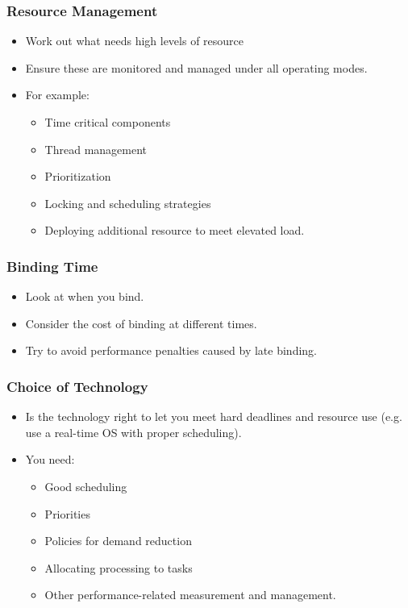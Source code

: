 \documentclass[a4paper]{article}
\begin{document}
\subsubsection{Resource Management}
\begin{itemize}
\item{Work out what needs high levels of resource}
\item{Ensure these are monitored and managed under all operating modes.}
\item{For example:
\begin{itemize}
\item{Time critical components}
\item{Thread management}
\item{Prioritization}
\item{Locking and scheduling strategies}
\item{Deploying additional resource to meet elevated load.}
\end{itemize}
}
\end{itemize}


\subsubsection{Binding Time}
\begin{itemize}
\item{Look at when you bind.}
\item{Consider the cost of binding at different times.}
\item{Try to avoid performance penalties caused by late binding.}
\end{itemize}

\subsubsection{Choice of Technology}
\begin{itemize}
\item{Is the technology right to let you meet hard deadlines and resource use (e.g. use a real-time OS with proper scheduling).}
\item{You need:
\begin{itemize}
\item{Good scheduling}
\item{Priorities}
\item{Policies for demand reduction}
\item{Allocating processing to tasks}
\item{Other performance-related measurement and management.}
\end{itemize}}
\end{itemize}
\end{document}
